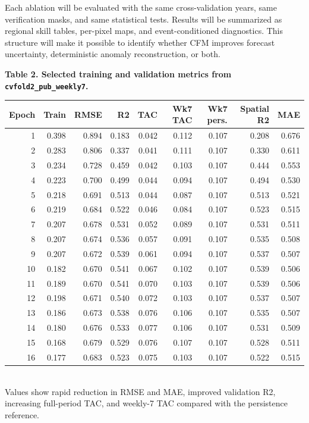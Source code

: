 \documentclass[11pt,letterpaper]{article}
\begin{document}
Each ablation will be evaluated with the same cross-validation years, same verification masks, and same statistical tests. Results will be summarized as regional skill tables, per-pixel maps, and event-conditioned diagnostics. This structure will make it possible to identify whether CFM improves forecast uncertainty, deterministic anomaly reconstruction, or both.

\begin{center}\scriptsize
\textbf{Table 2. Selected training and validation metrics from \texttt{cvfold2\_pub\_weekly7}.}\\[0.03in]
\begin{tabular}{rrrrrrrrr}
\toprule
\textbf{Epoch} & \textbf{Train} & \textbf{RMSE} & \textbf{R2} & \textbf{TAC} & \textbf{Wk7 TAC} & \textbf{Wk7 pers.} & \textbf{Spatial R2} & \textbf{MAE}\\
\midrule
1 & 0.398 & 0.894 & 0.183 & 0.042 & 0.112 & 0.107 & 0.208 & 0.676\\
2 & 0.283 & 0.806 & 0.337 & 0.041 & 0.111 & 0.107 & 0.330 & 0.611\\
3 & 0.234 & 0.728 & 0.459 & 0.042 & 0.103 & 0.107 & 0.444 & 0.553\\
4 & 0.223 & 0.700 & 0.499 & 0.044 & 0.094 & 0.107 & 0.494 & 0.530\\
5 & 0.218 & 0.691 & 0.513 & 0.044 & 0.087 & 0.107 & 0.513 & 0.521\\
6 & 0.219 & 0.684 & 0.522 & 0.046 & 0.084 & 0.107 & 0.523 & 0.515\\
7 & 0.207 & 0.678 & 0.531 & 0.052 & 0.089 & 0.107 & 0.531 & 0.511\\
8 & 0.207 & 0.674 & 0.536 & 0.057 & 0.091 & 0.107 & 0.535 & 0.508\\
9 & 0.207 & 0.672 & 0.539 & 0.061 & 0.094 & 0.107 & 0.537 & 0.507\\
10 & 0.182 & 0.670 & 0.541 & 0.067 & 0.102 & 0.107 & 0.539 & 0.506\\
11 & 0.189 & 0.670 & 0.541 & 0.070 & 0.103 & 0.107 & 0.539 & 0.506\\
12 & 0.198 & 0.671 & 0.540 & 0.072 & 0.103 & 0.107 & 0.537 & 0.507\\
13 & 0.186 & 0.673 & 0.538 & 0.076 & 0.106 & 0.107 & 0.535 & 0.507\\
14 & 0.180 & 0.676 & 0.533 & 0.077 & 0.106 & 0.107 & 0.531 & 0.509\\
15 & 0.168 & 0.679 & 0.529 & 0.076 & 0.107 & 0.107 & 0.528 & 0.511\\
16 & 0.177 & 0.683 & 0.523 & 0.075 & 0.103 & 0.107 & 0.522 & 0.515\\
\bottomrule
\end{tabular}\\[0.03in]
\footnotesize Values show rapid reduction in RMSE and MAE, improved validation R2, increasing full-period TAC, and weekly-7 TAC compared with the persistence reference.
\end{center}
\end{document}
